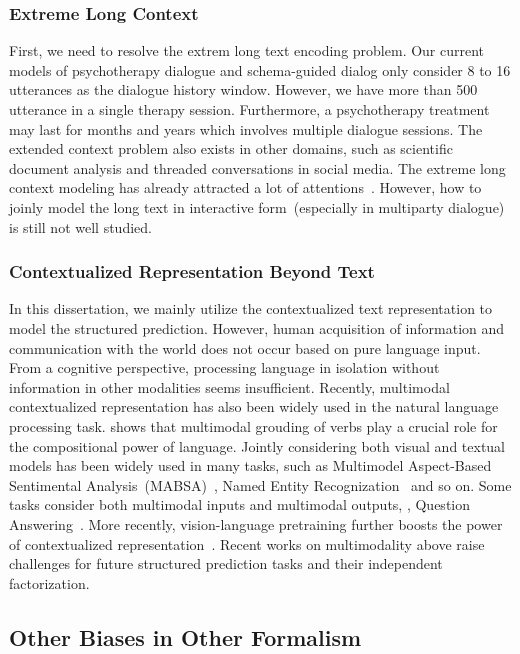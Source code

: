 \subsubsection{Extreme Long Context}
\label{sssec:future:extrem-long-context}
First, we need to resolve the extrem long text encoding problem. Our
current models of psychotherapy dialogue and schema-guided dialog only
consider 8 to 16 utterances as the dialogue history window. However,
we have more than 500 utterance in a single therapy
session. Furthermore, a psychotherapy treatment may last for months
and years which involves multiple dialogue sessions. The extended
context problem also exists in other domains, such as scientific
document analysis and threaded conversations in social media. The
extreme long context modeling has already attracted a lot of
attentions~\citep{tay2020long,gu2021efficiently}. However, how to
joinly model the long text in interactive form~(especially in
multiparty dialogue) is still not well studied.


\subsubsection{Contextualized Representation Beyond Text}
\label{sssec:future:beyond-text}
In this dissertation, we mainly utilize the contextualized text
representation to model the structured prediction. However, human
acquisition of information and communication with the world does not
occur based on pure language input. From a cognitive perspective,
processing language in isolation without information in other
modalities seems insufficient. Recently, multimodal contextualized
representation has also been widely used in the natural language
processing task. \citet{beinborn-etal-2018-multimodal} shows that
multimodal grouding of verbs play a crucial role for the compositional
power of language. Jointly considering both visual and textual models
has been widely used in many tasks, such as Multimodel Aspect-Based
Sentimental Analysis~(MABSA)~\cite{ju2021joint}, Named Entity
Recognization~\cite{zhang2021multi} and so on. Some tasks consider
both multimodal inputs and multimodal outputs, \eg, Question
Answering~\cite{singh-etal-2021-mimoqa}. More recently,
vision-language pretraining further boosts the power of
contextualized
representation~\cite{lu2019vilbert,ling-etal-2022-vision}. Recent
works on multimodality above raise challenges for future structured
prediction tasks and their independent factorization.

\subsection{Other Biases in Other Formalism}
\label{ssec:future:other-biases}

